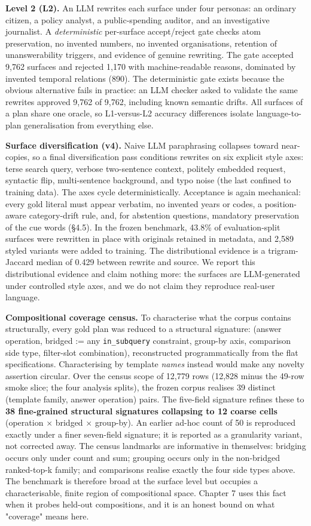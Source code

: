 \documentclass[10pt]{article} %
\begin{document}
\textbf{Level 2 (L2).} An LLM rewrites each surface under four personas: an ordinary citizen, a policy analyst, a public-spending auditor, and an investigative journalist. A \emph{deterministic} per-surface accept/reject gate checks atom preservation, no invented numbers, no invented organisations, retention of unanswerability triggers, and evidence of genuine rewriting. The gate accepted 9,762 surfaces and rejected 1,170 with machine-readable reasons, dominated by invented temporal relations (890). The deterministic gate exists because the obvious alternative fails in practice: an LLM checker asked to validate the same rewrites approved 9,762 of 9,762, including known semantic drifts. All surfaces of a plan share one oracle, so L1-versus-L2 accuracy differences isolate language-to-plan generalisation from everything else.

\textbf{Surface diversification (v4).} Naive LLM paraphrasing collapses toward near-copies, so a final diversification pass conditions rewrites on six explicit style axes: terse search query, verbose two-sentence context, politely embedded request, syntactic flip, multi-sentence background, and typo noise (the last confined to training data). The axes cycle deterministically. Acceptance is again mechanical: every gold literal must appear verbatim, no invented years or codes, a position-aware category-drift rule, and, for abstention questions, mandatory preservation of the cue words (\S4.5). In the frozen benchmark, 43.8\% of evaluation-split surfaces were rewritten in place with originals retained in metadata, and 2,589 styled variants were added to training. The distributional evidence is a trigram-Jaccard median of 0.429 between rewrite and source. We report this distributional evidence and claim nothing more: the surfaces are LLM-generated under controlled style axes, and we do not claim they reproduce real-user language.

\textbf{Compositional coverage census.} To characterise what the corpus contains structurally, every gold plan was reduced to a structural signature: (answer operation, bridged := any \texttt{in\_subquery} constraint, group-by axis, comparison side type, filter-slot combination), reconstructed programmatically from the flat specifications. Characterising by template \emph{names} instead would make any novelty assertion circular. Over the census scope of 12,779 rows (12,828 minus the 49-row smoke slice; the four analysis splits), the frozen corpus realises 39 distinct (template family, answer operation) pairs. The five-field signature refines these to \textbf{38 fine-grained structural signatures collapsing to 12 coarse cells} (operation $\times$ bridged $\times$ group-by). An earlier ad-hoc count of 50 is reproduced exactly under a finer seven-field signature; it is reported as a granularity variant, not corrected away. The census landmarks are informative in themselves: bridging occurs only under count and sum; grouping occurs only in the non-bridged ranked-top-k family; and comparisons realise exactly the four side types above. The benchmark is therefore broad at the surface level but occupies a characterisable, finite region of compositional space. Chapter 7 uses this fact when it probes held-out compositions, and it is an honest bound on what "coverage" means here.
\end{document}

